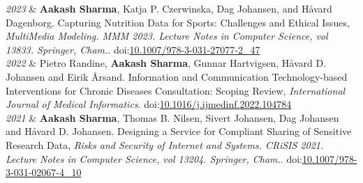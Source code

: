 \documentclass[11pt, a4paper]{article}
\newcommand{\DOI}[1]{doi:\href{https://doi.org/#1}{#1}}
\newcommand{\Year}[1]{\fontsize{10pt}{0}\selectfont #1}
\begin{document}
\begin{EntriesTable}
	
	\Year{\textit{2023}}  &
	\textbf{Aakash Sharma}, Katja P. Czerwinska, Dag Johansen, and Håvard Dagenborg.
	Capturing Nutrition Data for Sports: Challenges and Ethical Issues,
	\emph{MultiMedia Modeling. MMM 2023. Lecture Notes in Computer Science, vol 13833. Springer, Cham.}. 
	\DOI{10.1007/978-3-031-27077-2\_47}
	\\
	
	
	\Year{\textit{2022}}  &
	Pietro Randine, \textbf{Aakash Sharma}, Gunnar Hartvigsen, Håvard D. Johansen and Eirik Årsand.
	Information and Communication Technology-based Interventions for Chronic Diseases Consultation: Scoping Review,
	\emph{International Journal of Medical Informatics}. 
	\DOI{10.1016/j.ijmedinf.2022.104784}
	\\
	
	
	\Year{\textit{2021}}  &
	\textbf{Aakash Sharma}, Thomas B. Nilsen, Sivert Johansen, Dag Johansen and Håvard D. Johansen.
	Designing a Service for Compliant Sharing of Sensitive Research Data,
	\emph{Risks and Security of Internet and Systems. CRiSIS 2021. Lecture Notes in Computer Science, vol 13204. Springer, Cham.}. 
	\DOI{10.1007/978-3-031-02067-4\_10}
	\\
	

\end{EntriesTable}
\end{document}

